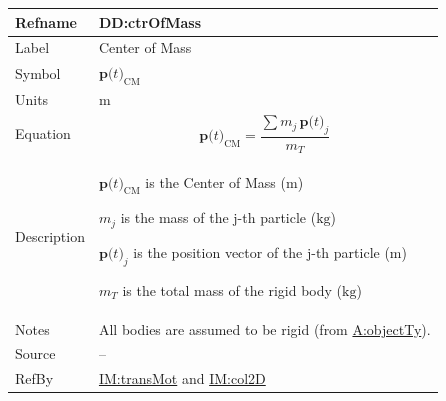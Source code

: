 \documentclass[12pt]{article}
\begin{document}
\medskip
\noindent
\begin{minipage}{\textwidth}
\begin{tabular}{>{\raggedright}p{}>{\raggedright\arraybackslash}p{}}
\toprule \textbf{Refname} & \textbf{DD:ctrOfMass}
\label{DD:ctrOfMass}
\\ \midrule
Label & Center of Mass
        
\\ \midrule
Symbol & ${\symbf{p}\text{(}t\text{)}_{\text{CM}}}$
         
\\ \midrule
Units & ${\text{m}}$
        
\\ \midrule
Equation & \begin{displaymath}
           {\symbf{p}\text{(}t\text{)}_{\text{CM}}}=\frac{\displaystyle\sum{{m_{j}}\,{\symbf{p}\text{(}t\text{)}_{j}}}}{{m_{T}}}
           \end{displaymath}
\\ \midrule
Description & \begin{symbDescription}
              \item{${\symbf{p}\text{(}t\text{)}_{\text{CM}}}$ is the Center of Mass (${\text{m}}$)}
              \item{${m_{j}}$ is the mass of the j-th particle (${\text{kg}}$)}
              \item{${\symbf{p}\text{(}t\text{)}_{j}}$ is the position vector of the j-th particle (${\text{m}}$)}
              \item{${m_{T}}$ is the total mass of the rigid body (${\text{kg}}$)}
              \end{symbDescription}
\\ \midrule
Notes & All bodies are assumed to be rigid (from \hyperref[assumpOT]{A:objectTy}).
        
\\ \midrule
Source & --
         
\\ \midrule
RefBy & \hyperref[IM:transMot]{IM:transMot} and \hyperref[IM:col2D]{IM:col2D}
        
\\ \bottomrule
\end{tabular}
\end{minipage}
\end{document}
